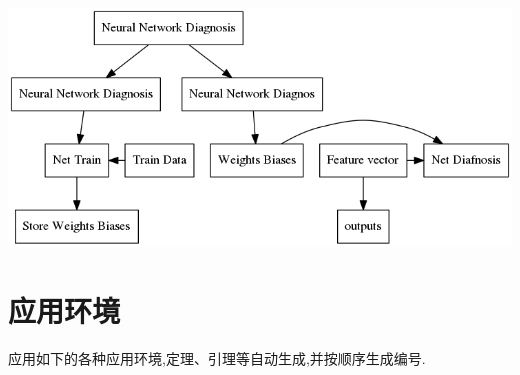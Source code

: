 \documentclass{ctacn}%
\begin{document}
\begin{multicols}{2}
\begin{center}
	\includegraphics[scale=0.3, trim=0 0 0 0]{figs/procedure}
\end{center}








\section{应用环境}
应用如下的各种应用环境,定理、引理等自动生成,并按顺序生成编号.










\end{multicols}
\end{document}

